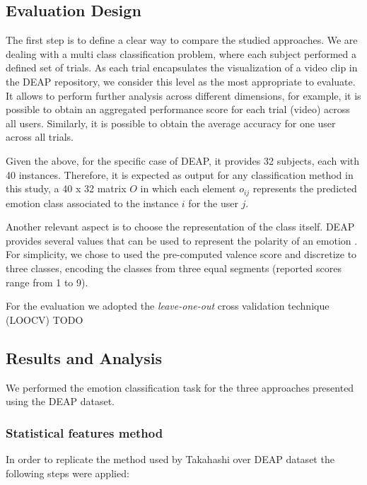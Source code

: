 \documentclass{sig-alternate}
\begin{document}
\subsection{ Evaluation Design} 

The first step is to define a clear way to compare the 
studied approaches. We are dealing with a multi class classification
problem, where  each subject performed a defined set of trials. As
each trial encapsulates the visualization of a video clip in the DEAP 
repository, we consider
this level as the most appropriate to evaluate. It allows to perform 
further analysis across different dimensions, for example, it is possible
to obtain an aggregated performance score for each  trial (video) 
across all users. Similarly, it is possible to obtain the average 
accuracy for one 
user across all trials.

Given the above,  for the specific case of DEAP, it provides 32
subjects, 
each with 40 instances. Therefore, it is expected as output for any 
classification method in this study, a  40 x 32 matrix  $O$ in  which 
each element $o_{ij}$ represents the predicted emotion class 
associated to the instance $i$ for the user $j$.
 
Another relevant aspect is to choose the representation of the 
class itself. DEAP provides several  values that can be used to 
represent the polarity of an emotion . For simplicity, we chose to used 
the pre-computed valence score  and discretize to three classes, 
encoding the classes from three equal segments (reported scores
range from 1 to 9). 

For the evaluation we adopted the \emph{leave-one-out} cross 
validation technique (LOOCV)\cite{elisseeff2003leave,kearns1999algorithmic}
TODO
\subsection{ Results and Analysis}

We performed the emotion classification task for the three approaches presented
using the DEAP dataset.

\subsubsection{Statistical features method}	

In order to replicate the method used by Takahashi over DEAP dataset the following 
steps were applied:
\end{document}
